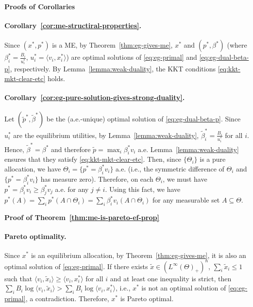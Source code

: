 	\smallskip\noindent\textbf{Proofs of Corollaries}

	\paragraph{Corollary~\ref{cor:me-structiral-properties}.} 
	Since $(x^*, p^*)$ is a ME, by Theorem~\ref{thm:eg-gives-me}, $x^*$ and $(p^*, \beta^*)$ (where $\beta^*_i = \frac{B_i}{u^*_i}$, $u^*_i = \langle v_i, x^*_i\rangle$) are optimal solutions of \eqref{eq:eg-primal} and \eqref{eq:eg-dual-beta-p}, respectively. By Lemma~\ref{lemma:weak-duality}, the KKT conditions \eqref{eq:kkt-mkt-clear-etc} holds. 

	\paragraph{Corollary~\ref{cor:eg-pure-solution-gives-strong-duality}.}
	Let $(\tilde{p}^*, \tilde{\beta}^*)$ be the (a.e.-unique) optimal solution of \eqref{eq:eg-dual-beta-p}.
	Since $u^*_i$ are the equilibrium utilities, by Lemma~\ref{lemma:weak-duality}, $\tilde{\beta}^*_i = \frac{B_i}{u^*_i}$ for all $i$. Hence, $\tilde{\beta}^* = \beta^*$ and therefore $\tilde{p} = \max_i \beta^*_i v_i$ a.e. 
	Lemma~\ref{lemma:weak-duality} ensures that they satisfy \eqref{eq:kkt-mkt-clear-etc}. 
	Then, since $\{\Theta_i\}$ is a pure allocation, we have $\Theta_i = \{ p^* = \beta^*_i v_i \}$ a.e. (i.e., the symmetric difference of $\Theta_i$ and $\{ p^* = \beta^*_i v_i \}$ has measure zero). 
	Therefore, on each $\Theta_i$, we must have $p^* = \beta^*_i v_i \geq \beta^*_j v_j$ a.e. for any $j\neq i$. 
	Using this fact, we have
	$ p^*(A) = \sum_i p^*(A\cap \Theta_i) = \sum_i \beta^*_i v_i(A\cap \Theta_i)$
	for any measurable set $A \subseteq \Theta$. 

	\smallskip\noindent\textbf{Proof of Theorem~\ref{thm:me-is-pareto-ef-prop}}

	\paragraph{Pareto optimality.}
	Since $x^*$ is an equilibrium allocation, by Theorem~\ref{thm:eg-gives-me}, it is also an optimal solution of \eqref{eq:eg-primal}. If there exists $\tilde{x}\in (L^\infty(\Theta)_+)^n$, $\sum_i \tilde{x}_i \leq 1$ such that $\langle v_i, \tilde{x}_i \rangle \geq \langle v_i, x^*_i \rangle$ for all $i$ and at least one inequality is strict, then 
	$\sum_i B_i \log \langle v_i, \tilde{x}_i \rangle > \sum_i B_i \log \langle v_i, x^*_i \rangle$,
	i.e., $x^*$ is not an optimal solution of \eqref{eq:eg-primal}, a contradiction. Therefore, $x^*$ is Pareto optimal.
	

